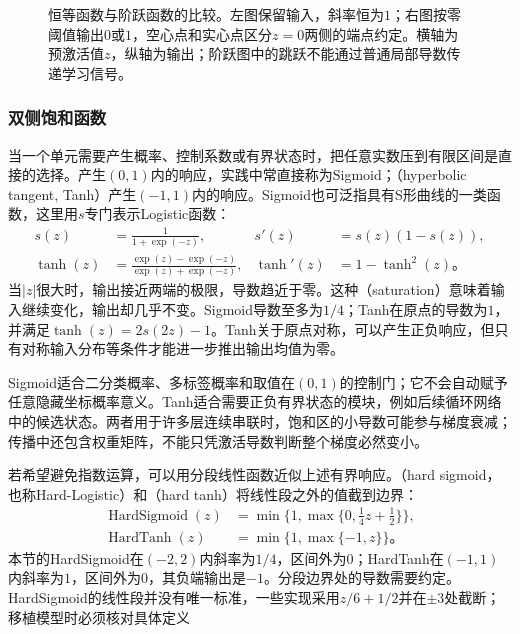 \begin{figure}[htb]
  \centering
  
  \caption{恒等函数与阶跃函数的比较。左图保留输入，斜率恒为$1$；右图按零阈值输出$0$或$1$，空心点和实心点区分$z=0$两侧的端点约定。横轴为预激活值$z$，纵轴为输出；阶跃图中的跳跃不能通过普通局部导数传递学习信号。}
  \label{fig:ffn-activation-basics}
\end{figure}

\subsubsection{双侧饱和函数}
\label{sec:ffn-activation-saturating}

当一个单元需要产生概率、控制系数或有界状态时，把任意实数压到有限区间是直接的选择。产生$(0,1)$内的响应，实践中常直接称为Sigmoid；（hyperbolic tangent, Tanh）产生$(-1,1)$内的响应。Sigmoid也可泛指具有S形曲线的一类函数，这里用$s$专门表示Logistic函数：
\begin{equation}
  \begin{aligned}
    s(z)&=\frac{1}{1+\exp(-z)},
    &s'(z)&=s(z)(1-s(z)),\\
    \tanh(z)&=\frac{\exp(z)-\exp(-z)}{\exp(z)+\exp(-z)},
    &\tanh'(z)&=1-\tanh^2(z)\text{。}
  \end{aligned}
  \label{eq:ffn-saturating-activations}
\end{equation}
当$|z|$很大时，输出接近两端的极限，导数趋近于零。这种（saturation）意味着输入继续变化，输出却几乎不变。Sigmoid导数至多为$1/4$；Tanh在原点的导数为$1$，并满足$\tanh(z)=2s(2z)-1$。Tanh关于原点对称，可以产生正负响应，但只有对称输入分布等条件才能进一步推出输出均值为零。

Sigmoid适合二分类概率、多标签概率和取值在$(0,1)$的控制门；它不会自动赋予任意隐藏坐标概率意义。Tanh适合需要正负有界状态的模块，例如后续循环网络中的候选状态。两者用于许多层连续串联时，饱和区的小导数可能参与梯度衰减；传播中还包含权重矩阵，不能只凭激活导数判断整个梯度必然变小。

若希望避免指数运算，可以用分段线性函数近似上述有界响应。（hard sigmoid，也称Hard-Logistic）和（hard tanh）将线性段之外的值截到边界：
\begin{equation}
  \begin{aligned}
    \operatorname{HardSigmoid}(z)
      &=\min\{1,\max\{0,\tfrac14z+\tfrac12\}\},\\
    \operatorname{HardTanh}(z)&=\min\{1,\max\{-1,z\}\}\text{。}
  \end{aligned}
  \label{eq:ffn-hard-saturating-activations}
\end{equation}
本节的HardSigmoid在$(-2,2)$内斜率为$1/4$，区间外为$0$；HardTanh在$(-1,1)$内斜率为$1$，区间外为$0$，其负端输出是$-1$。分段边界处的导数需要约定。HardSigmoid的线性段并没有唯一标准，一些实现采用$z/6+1/2$并在$\pm3$处截断；移植模型时必须核对具体定义

